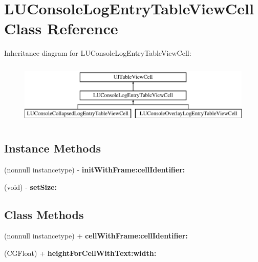 \hypertarget{interface_l_u_console_log_entry_table_view_cell}{}\section{L\+U\+Console\+Log\+Entry\+Table\+View\+Cell Class Reference}
\label{interface_l_u_console_log_entry_table_view_cell}
Inheritance diagram for L\+U\+Console\+Log\+Entry\+Table\+View\+Cell\+:\begin{figure}[H]
\begin{center}
\leavevmode
\includegraphics[height=3.000000cm]{interface_l_u_console_log_entry_table_view_cell}
\end{center}
\end{figure}
\subsection*{Instance Methods}
\begin{DoxyCompactItemize}
\item 
\mbox{\label{interface_l_u_console_log_entry_table_view_cell_a5ee24795e06e1a6ee18e6dacfc31ddc8}} 
(nonnull instancetype) -\/ {\bfseries init\+With\+Frame\+:cell\+Identifier\+:}
\item 
\mbox{\label{interface_l_u_console_log_entry_table_view_cell_a6838648b6467f8ecb1ad5cf5ffe2c22c}} 
(void) -\/ {\bfseries set\+Size\+:}
\end{DoxyCompactItemize}
\subsection*{Class Methods}
\begin{DoxyCompactItemize}
\item 
\mbox{\label{interface_l_u_console_log_entry_table_view_cell_a109a174f6cf8e01ed0f9f8a5bbde9e52}} 
(nonnull instancetype) + {\bfseries cell\+With\+Frame\+:cell\+Identifier\+:}
\item 
\mbox{\label{interface_l_u_console_log_entry_table_view_cell_ac7e5e51f60f4c6e14b1de175329cd8c9}} 
(C\+G\+Float) + {\bfseries height\+For\+Cell\+With\+Text\+:width\+:}
\end{DoxyCompactItemize}
